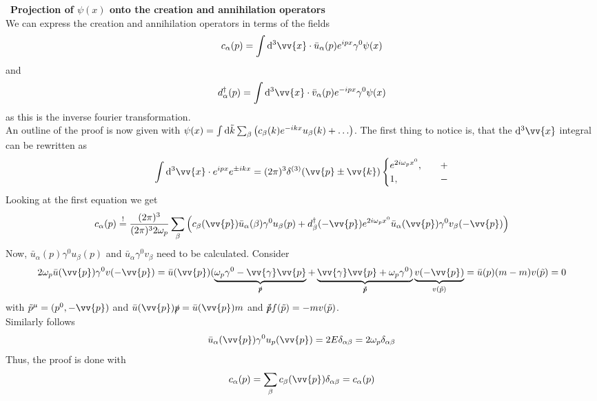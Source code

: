 \documentclass{include/thesisclass}
\newcommand{\cc}{\cdot}
\newcommand{\vx}{\vv{x}}
\newcommand{\vp}{\vv{p}}
\newcommand{\dd}{{\rm d}}
\newcommand{\soll}{\overset{!}{=}}
\newcommand{\sub}[1]{~\newline\newline\textbf{#1}\\}
\begin{document}
\sub{Projection of $\psi(x)$ onto the creation and annihilation operators}
We can express the creation and annihilation operators in terms of the fields 
\[ c_\alpha(p) = \int \dd^3 \vx \cc \bar u_\alpha (p) e^{ipx} \gamma^0 \psi(x)\]
and 
\[ d_\alpha^\dagger(p) = \int \dd^3 \vx \cc \bar v_\alpha(p) e^{-ipx} \gamma^0 \psi(x)\]
as this is the inverse fourier transformation.\\
An outline of the proof is now given with $\psi(x) = \int \dd \tilde k \sum_\beta\left( c_\beta(k) e^{-ikx} u_\beta(k) + \ldots \right)$.
The first thing to notice is, that the $\dd^3 \vx$ integral can be rewritten as
\[ \int \dd^3 \vx \cc e^{ipx} e^{\pm ikx} = (2\pi)^3 \delta^{(3)}(\vp \pm \vv{k}) \begin{cases} e^{2i\omega_p x^0},~~~ &+ \\ 1, ~~~ &-\end{cases}\]
Looking at the first equation we get
\[ c_\alpha(p) \soll \frac{(2\pi)^3}{(2\pi)^3 2\omega_p} \sum_\beta \left( c_\beta(\vp) \bar u _\alpha(\beta) \gamma^0 u_\beta(p) + d^\dagger_\beta(-\vp) e^{2i\omega_p x^0} \bar u _\alpha(\vp) \gamma^0 v_\beta(-\vp)\right)\]
Now, $ \bar u_\alpha(p) \gamma^0 u_\beta(p)$ and $\bar u_\alpha \gamma^0 v_\beta$ need to be calculated. Consider
\[ 2 \omega_p \bar u (\vp) \gamma^0 v(-\vp) = \bar u (\vp)( \underbrace{ \omega_p \gamma^0 - \vv{\gamma} \vp}_{\slashed p} + \underbrace{ \vv{\gamma} \vp + \omega_p \gamma^0)}_{\slashed{\tilde p}}  \underbrace{v(-\vp)}_{v(\tilde p)} = \bar u (p) (m -m) v(\tilde p) = 0\]
with $ \tilde p ^\mu = ( p^0, -\vp)$ and $\bar u (\vp) \slashed p = \bar u (\vp) m$ and $\slashed{\tilde p} f(\tilde p) = - m v(\tilde p)$.\\
Similarly follows
\[ \bar u _\alpha( \vp) \gamma^0 u _p(\vp) = 2 E \delta_{\alpha\beta} = 2\omega_p \delta_{\alpha\beta}\]
Thus, the proof is done with
\[ c_\alpha(p) = \sum_\beta c_\beta(\vp) \delta_{\alpha \beta} = c_\alpha(p)\]
\end{document}
